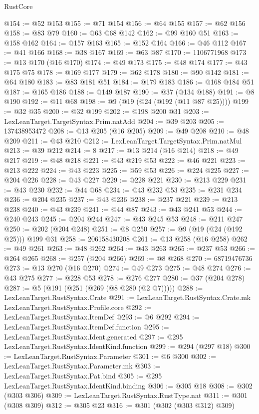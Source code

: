 \begin{lexlean}{RustCore}
\begin{coremodule}
@154 := @52 @153
@155 := @71 @154
@156 := @64 @155
@157 := @62 @156
@158 := @83 @79
@160 := @63 @68 @142
@162 := @99 @160 @51
@163 := @158 @162
@164 := @157 @163
@165 := @152 @164
@166 := @46 @112
@167 := @41 @166
@168 := @38 @167
@169 := @63 @87
@170 := 1106771968
@173 := @13 @170 (@16 @170)
@174 := @49 @173
@175 := @48 @174
@177 := @43 @175 @75
@178 := @169 @177
@179 := @62 @178
@180 := @90 @142
@181 := @64 @180
@183 := @83 @181 @51
@184 := @179 @183
@186 := @168 @184 @51
@187 := @165 @186
@188 := @149 @187
@190 := @37 (@134 @188)
@191 := @8 @190
@192 := @11 @68
@198 := @9 (@19 (@24 (@192 (@11 @87 @25))))
@199 := @32 @35
@200 := @32 @199
@202 := @198 @200 @31
@203 := LexLeanTarget.TargetSyntax.Prim.natAdd
@204 := @39 @203
@205 := 137438953472
@208 := @13 @205 (@16 @205)
@209 := @49 @208
@210 := @48 @209
@211 := @43 @210
@212 := LexLeanTarget.TargetSyntax.Prim.natMul
@213 := @39 @212
@214 := 8
@217 := @13 @214 (@16 @214)
@218 := @49 @217
@219 := @48 @218
@221 := @43 @219 @53
@222 := @46 @221
@223 := @213 @222
@224 := @43 @223
@225 := @59 @53
@226 := @224 @225
@227 := @204 @226
@228 := @43 @227
@229 := @228 @221
@230 := @213 @229
@231 := @43 @230
@232 := @44 @68
@234 := @43 @232 @53
@235 := @231 @234
@236 := @204 @235
@237 := @43 @236
@238 := @237 @221
@239 := @213 @238
@240 := @43 @239
@241 := @44 @87
@243 := @43 @241 @53
@244 := @240 @243
@245 := @204 @244
@247 := @43 @245 @53
@248 := @211 @247
@250 := @202 (@204 @248)
@251 := @8 @250
@257 := @9 (@19 (@24 (@192 @25))) @199 @31
@258 := 206158430208
@261 := @13 @258 (@16 @258)
@262 := @49 @261
@263 := @48 @262
@264 := @43 @263
@265 := @237 @53
@266 := @264 @265
@268 := @257 (@204 @266)
@269 := @8 @268
@270 := 68719476736
@273 := @13 @270 (@16 @270)
@274 := @49 @273
@275 := @48 @274
@276 := @43 @275
@277 := @228 @53
@278 := @276 @277
@280 := @37 (@204 @278)
@287 := @5 (@191 (@251 (@269 (@8 @280 (@2 @7)))))
@288 := LexLeanTarget.RustSyntax.Crate
@291 := LexLeanTarget.RustSyntax.Crate.mk LexLeanTarget.RustSyntax.Profile.core
@292 := LexLeanTarget.RustSyntax.ItemDef
@293 := @6 @292
@294 := LexLeanTarget.RustSyntax.ItemDef.function
@295 := LexLeanTarget.RustSyntax.Ident.generated
@297 := @295 LexLeanTarget.RustSyntax.IdentKind.function
@299 := @294 (@297 @18)
@300 := LexLeanTarget.RustSyntax.Parameter
@301 := @6 @300
@302 := LexLeanTarget.RustSyntax.Parameter.mk
@303 := LexLeanTarget.RustSyntax.Pat.bind
@305 := @295 LexLeanTarget.RustSyntax.IdentKind.binding
@306 := @305 @18
@308 := @302 (@303 @306)
@309 := LexLeanTarget.RustSyntax.RustType.nat
@311 := @301 (@308 @309)
@312 := @305 @23
@316 := @301 (@302 (@303 @312) @309)

\end{coremodule}
\end{lexlean}
